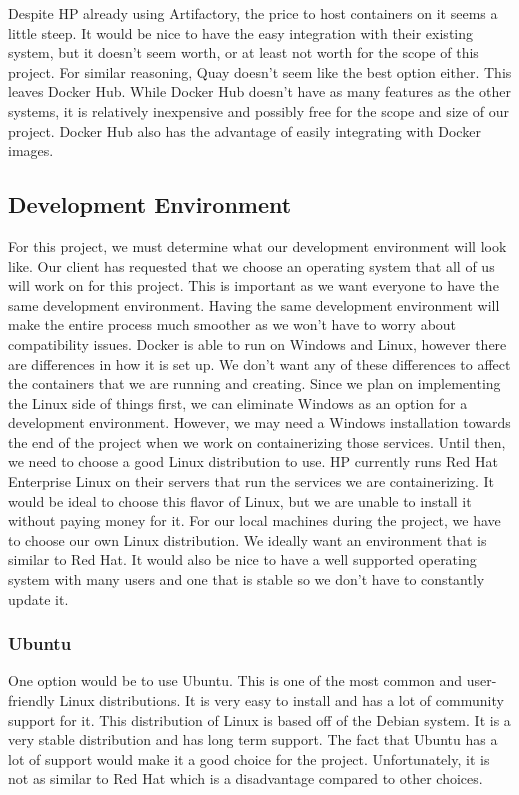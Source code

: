 \documentclass[onecolumn, draftclsnofoot,10pt, compsoc]{IEEEtran}
\begin{document}
Despite HP already using Artifactory, the price to host containers on it seems a little steep. It would be nice to have the easy integration with their existing system, but it doesn't seem worth, or at least not worth for the scope of this project. For similar reasoning, Quay doesn't seem like the best option either. This leaves Docker Hub. While Docker Hub doesn't have as many features as the other systems, it is relatively inexpensive and possibly free for the scope and size of our project. Docker Hub also has the advantage of easily integrating with Docker images.


\subsection{Development Environment}
For this project, we must determine what our development environment will look like. Our client has requested that we choose an operating system that all of us will work on for this project. This is important as we want everyone to have the same development environment. Having the same development environment will make the entire process much smoother as we won’t have to worry about compatibility issues. Docker is able to run on Windows and Linux, however there are differences in how it is set up. We don’t want any of these differences to affect the containers that we are running and creating. Since we plan on implementing the Linux side of things first, we can eliminate Windows as an option for a development environment. However, we may need a Windows installation towards the end of the project when we work on containerizing those services. Until then, we need to choose a good Linux distribution to use. HP currently runs Red Hat Enterprise Linux on their servers that run the services we are containerizing. It would be ideal to choose this flavor of Linux, but we are unable to install it without paying money for it. For our local machines during the project, we have to choose our own Linux distribution. We ideally want an environment that is similar to Red Hat. It would also be nice to have a well supported operating system with many users and one that is stable so we don't have to constantly update it.

\subsubsection{Ubuntu}
One option would be to use Ubuntu. This is one of the most common and user-friendly Linux distributions. It is very easy to install and has a lot of community support for it. This distribution of Linux is based off of the Debian system.\cite{rh_vs_deb} It is a very stable distribution and has long term support. The fact that Ubuntu has a lot of support would make it a good choice for the project. Unfortunately, it is not as similar to Red Hat which is a disadvantage compared to other choices.  
\end{document}
